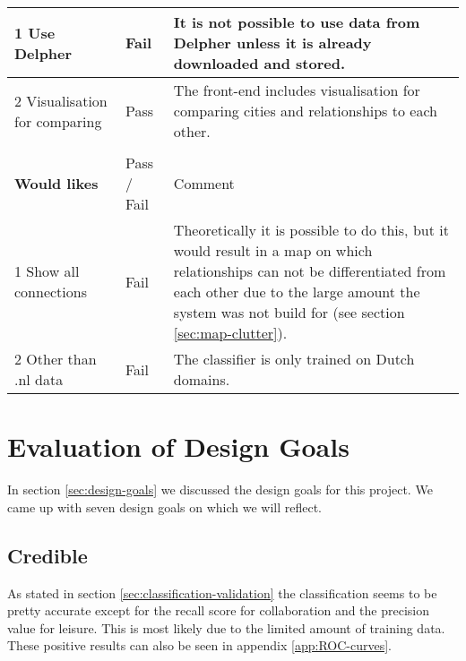 \begin{table}[H]
\begin{tabular}{ll m{8cm}}
1 Use Delpher                  & Fail        & It is not possible to use data from Delpher unless it is already downloaded and stored.                                                                                                                                               \\ \hline
2 Visualisation for comparing  & Pass        & The front-end includes visualisation for comparing cities and relationships to each other.                                                                                                                                            \\
                               &             &                                                                                                                                                                                                                                       \\
\textbf{Would likes}                    & Pass / Fail & Comment                                                                                                                                                                                                                               \\
1 Show all connections         & Fail        & Theoretically it is possible to do this, but it would result in a map on which relationships can not be differentiated from each other due to the large amount the system was not build for (see section \ref{sec:map-clutter}). \\ \hline
2 Other than .nl data          & Fail        & The classifier is only trained on Dutch domains.                                                                 
\end{tabular}
\end{table}

\section{Evaluation of Design Goals}
In section \ref{sec:design-goals} we discussed the design goals for this project. We came up with seven design goals on which we will reflect.

\subsection{Credible}
As stated in section \ref{sec:classification-validation} the classification seems to be pretty accurate except for the recall score for collaboration and the precision value for leisure. This is most likely due to the limited amount of training data. These positive results can also be seen in appendix \ref{app:ROC-curves}.

